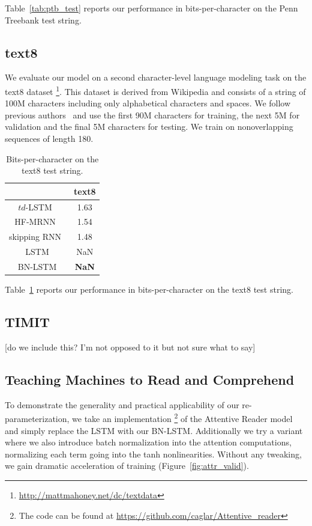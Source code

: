 \documentclass{article} %
\begin{document}
Table~\ref{tab:ptb_test} reports our performance in bits-per-character on the Penn Treebank test string.

\subsection{text8}

We evaluate our model on a second character-level language modeling task on the text8 dataset
\footnote{\url{http://mattmahoney.net/dc/textdata}}.
This dataset is derived from Wikipedia and consists of a string of 100M characters including only alphabetical characters and spaces.
We follow previous authors~\cite{mikolov2012subword,zhang2016architectural} and use the first 90M characters for training, the next 5M for validation and the final 5M characters for testing.
We train on nonoverlapping sequences of length 180.

\begin{table}
\center
\begin{tabular}{c|c}
  & text8 \\
  \hline
  $td$-LSTM~\cite{zhang2016architectural} & 1.63 \\
  HF-MRNN~\cite{mikolov2012subword} & 1.54 \\
  skipping RNN~\cite{pachitariu2013regularization} & 1.48 \\
  \hline
  LSTM & NaN \\
  BN-LSTM & \textbf{NaN} \\
\end{tabular}
\caption{Bits-per-character on the text8 test string.}
\label{tab:text8_test}
\end{table}

Table~\ref{tab:text8_test} reports our performance in bits-per-character on the text8 test string.

\subsection{TIMIT}

[do we include this? I'm not opposed to it but not sure what to say]

\subsection{Teaching Machines to Read and Comprehend}

To demonstrate the generality and practical applicability of our
re-parameterization, we take an implementation
\footnote{The code can be found at \url{https://github.com/caglar/Attentive_reader}}
of the Attentive Reader model~\cite{attentivereader} and simply replace the LSTM with our
BN-LSTM.
Additionally we try a variant where we also introduce batch
normalization into the attention computations, normalizing each term
going into the tanh nonlinearities.
Without any tweaking, we gain dramatic acceleration of training (Figure~\ref{fig:attr_valid}).
\end{document}
